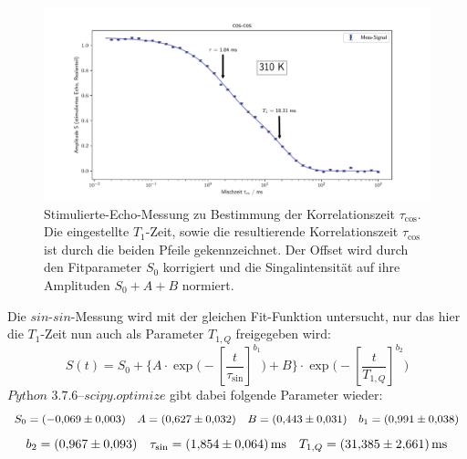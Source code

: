 \begin{figure}[H]
    \centering
    \includegraphics[width=\textwidth]{Auswertung/Para_der_Korrfkt/cos_cos.pdf}
    \caption{Stimulierte-Echo-Messung zu Bestimmung der Korrelationszeit
    $\tau_{\text{cos}}$. Die eingestellte $T_1$-Zeit, sowie die resultierende
    Korrelationszeit $\tau_{\text{cos}}$ ist durch die beiden Pfeile gekennzeichnet.
    Der Offset wird durch den Fitparameter $S_0$ korrigiert und die
    Singalintensität auf ihre Amplituden $S_0+A+B$ normiert.}
    \label{fig:cos}
\end{figure}
\noindent
Die $sin$-$sin$-Messung wird mit der gleichen Fit-Funktion untersucht, nur das hier die $T_1$-Zeit nun auch als Parameter $T_{1,Q}$ freigegeben wird:
\begin{equation*}
  S(t) = S_0 + \biggl\{
  A \cdot \exp\biggl(-\left[\frac{t}{\tau_{\text{sin}}} \right]^{b_1}
  \biggr) + B
  \biggr\} \cdot
  \exp\biggl(-\left[\frac{t}{T_{1,Q}} \right]^{b_2}
  \biggr)
\end{equation*}
\noindent
$\textit{Python 3.7.6--scipy.optimize}$ gibt dabei folgende Parameter wieder:
\begin{equation*}
  S_0 = \SI{-0.069\pm0.003}{}
  \quad
  A   = \SI{0.627\pm0.032}{}
  \quad
  B   = \SI{0.443\pm0.031}{}
  \quad
  b_1 = \SI{0.991\pm0,038}{}
\end{equation*}
\begin{equation*}
  b_2 = \SI{0,967\pm0.093}{}
  \quad
  \tau_{\text{sin}} = \SI{1,854\pm0,064}{\milli\second}
  \quad
  T_{1,Q} = \SI{31,385\pm2,661}{\milli\second}
\end{equation*}

